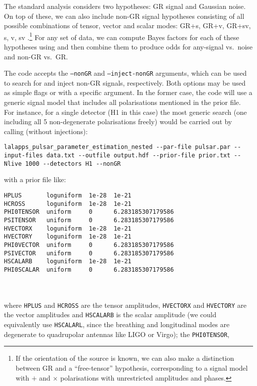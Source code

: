 The standard analysis considers two hypotheses: GR signal and Gaussian noise. On top of these, we can also include non-GR signal hypotheses consisting of all
possible combinations of tensor, vector and scalar modes: GR+s, GR+v, GR+sv, s, v, sv \citep[see][for definitions of these]{MaxCWpolariations}.\footnote{If the
orientation of the source is known, we can also make a distinction between GR and a ``free-tensor'' hypothesis, corresponding to a signal model with $+$ and $\times$
polarisations with unrestricted amplitudes and phases.} For any set of data, we can compute Bayes factors for each of these hypotheses using \lppen and then combine
them to produce odds for any-signal vs.\ noise and non-GR vs.\ GR.

The \lppen code accepts the {\tt --nonGR} and {\tt --inject-nonGR} arguments, which can be used to search for and inject non-GR signals, respectively. Both options may
be used as simple flags or with a specific argument. In the former case, the code will use a generic signal model that includes all polarisations mentioned in the prior
file. For instance, for a single detector (H1 in this case) the most generic search (one including all 5 non-degenerate polarisations freely) would be carried out by calling (without injections):
\begin{lstlisting}[frame=single]
lalapps_pulsar_parameter_estimation_nested --par-file pulsar.par --input-files data.txt --outfile output.hdf --prior-file prior.txt --Nlive 1000 --detectors H1 --nonGR
\end{lstlisting}
with a prior file like:
\begin{lrbox}{\Lst}
\begin{lstlisting}
HPLUS       loguniform  1e-28  1e-21
HCROSS      loguniform  1e-28  1e-21
PHI0TENSOR  uniform     0      6.283185307179586
PSITENSOR   uniform     0      6.283185307179586
HVECTORX    loguniform  1e-28  1e-21
HVECTORY    loguniform  1e-28  1e-21
PHI0VECTOR  uniform     0      6.283185307179586
PSIVECTOR   uniform     0      6.283185307179586
HSCALARB    loguniform  1e-28  1e-21
PHI0SCALAR  uniform     0      6.283185307179586
\end{lstlisting}
\end{lrbox}
\\[5pt] \indent \fbox{\usebox{\Lst}} \\[5pt]
where {\tt HPLUS} and {\tt HCROSS} are the tensor amplitudes, {\tt HVECTORX} and {\tt HVECTORY} are the vector amplitudes and {\tt HSCALARB} is the scalar amplitude
(we could equivalently use {\tt HSCALARL}, since the breathing and longitudinal modes are degenerate to quadrupolar antennas like LIGO or Virgo); the {\tt PHI0TENSOR},
